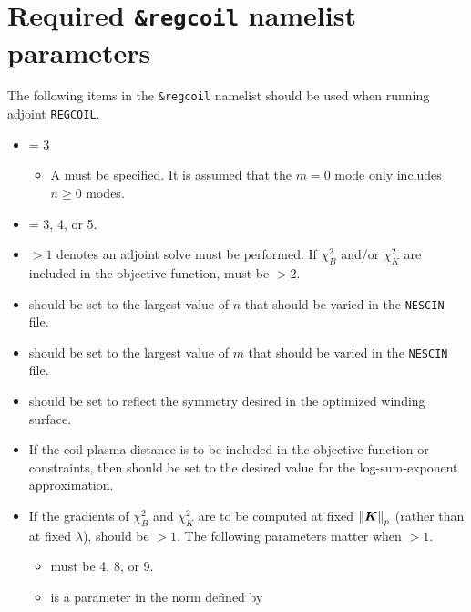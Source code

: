 \section{Required \texttt{\&regcoil} namelist parameters}
The following items in the \texttt{\&regcoil} namelist should be used when running adjoint \texttt{REGCOIL}.
\begin{itemize}
\item {} = 3 
    \begin{itemize}
    \item A  must be specified. It is assumed that the $m=0$ mode only includes $n\geq0$ modes. 
    \end{itemize}
\item {} = 3, 4, or 5.
\item {} $>1$ denotes an adjoint solve must be performed. If $\chi^2_B$ and/or $\chi^2_K$ are included in the objective function,  must be $>2$.
\item {} should be set to the largest value of $n$ that should be varied in the \texttt{NESCIN} file.
\item {} should be set to the largest value of $m$ that should be varied in the \texttt{NESCIN} file. 
\item {} should be set to reflect the symmetry desired in the optimized winding surface. 
\item If the coil-plasma distance is to be included in the objective function or constraints, then  should be set to the desired value for the log-sum-exponent approximation. 
\item If the gradients of $\chi^2_B$ and $\chi^2_K$ are to be computed at fixed $\norm{\bm{K}}_p$ (rather than at fixed $\lambda$),  should be $>1$. The following parameters matter when  $>1$. 
	\begin{itemize}
	\item {} must be 4, 8, or 9. 
	\item {} is a parameter in the norm defined by 
	\end{itemize}
\end{itemize}

